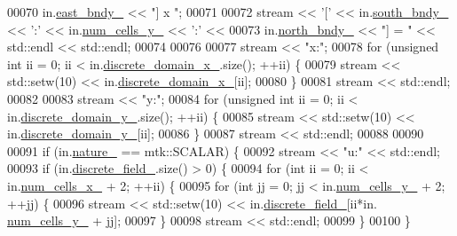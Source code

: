 \begin{DoxyCode}
00070   in.\hyperlink{classmtk_1_1UniStgGrid2D_ae24f3d5bf5ed3a6d066cdf48aa1fb307}{east\_bndy\_} << \textcolor{stringliteral}{"] x "};
00071 
00072   stream << \textcolor{charliteral}{'['} << in.\hyperlink{classmtk_1_1UniStgGrid2D_ac228c81fad7f4feeae93fb3c09d7e175}{south\_bndy\_} << \textcolor{charliteral}{':'} << in.\hyperlink{classmtk_1_1UniStgGrid2D_a3e4f61d781212ad57c34e9446c4074b6}{num\_cells\_y\_} << \textcolor{charliteral}{':'} <<
00073   in.\hyperlink{classmtk_1_1UniStgGrid2D_a3f904091b6e74aa78d8543e5cba26afb}{north\_bndy\_} << \textcolor{stringliteral}{"] = "} << std::endl << std::endl;
00074 
00076 
00077   stream << \textcolor{stringliteral}{"x:"};
00078   \textcolor{keywordflow}{for} (\textcolor{keywordtype}{unsigned} \textcolor{keywordtype}{int} ii = 0; ii < in.\hyperlink{classmtk_1_1UniStgGrid2D_ab15979865852583a46662ea592f27a4f}{discrete\_domain\_x\_}.size(); ++ii) \{
00079     stream << std::setw(10) << in.\hyperlink{classmtk_1_1UniStgGrid2D_ab15979865852583a46662ea592f27a4f}{discrete\_domain\_x\_}[ii];
00080   \}
00081   stream << std::endl;
00082 
00083   stream << \textcolor{stringliteral}{"y:"};
00084   \textcolor{keywordflow}{for} (\textcolor{keywordtype}{unsigned} \textcolor{keywordtype}{int} ii = 0; ii < in.\hyperlink{classmtk_1_1UniStgGrid2D_ad69f93d4b27707d97f209b907383a7a2}{discrete\_domain\_y\_}.size(); ++ii) \{
00085     stream << std::setw(10) << in.\hyperlink{classmtk_1_1UniStgGrid2D_ad69f93d4b27707d97f209b907383a7a2}{discrete\_domain\_y\_}[ii];
00086   \}
00087   stream << std::endl;
00088 
00090 
00091   \textcolor{keywordflow}{if} (in.\hyperlink{classmtk_1_1UniStgGrid2D_ac8b66740d328803f7fbabd1c42c775b2}{nature\_} == mtk::SCALAR) \{
00092     stream << \textcolor{stringliteral}{"u:"} << std::endl;
00093     \textcolor{keywordflow}{if} (in.\hyperlink{classmtk_1_1UniStgGrid2D_ad7474b2669ee988b84aed20b7f5dc7be}{discrete\_field\_}.size() > 0) \{
00094       \textcolor{keywordflow}{for} (\textcolor{keywordtype}{int} ii = 0; ii < in.\hyperlink{classmtk_1_1UniStgGrid2D_ac03a0f4840ee6ae1bc853e5d9c0df8d1}{num\_cells\_x\_} + 2; ++ii) \{
00095         \textcolor{keywordflow}{for} (\textcolor{keywordtype}{int} jj = 0; jj < in.\hyperlink{classmtk_1_1UniStgGrid2D_a3e4f61d781212ad57c34e9446c4074b6}{num\_cells\_y\_} + 2; ++jj) \{
00096           stream << std::setw(10) << in.\hyperlink{classmtk_1_1UniStgGrid2D_ad7474b2669ee988b84aed20b7f5dc7be}{discrete\_field\_}[ii*in.
      \hyperlink{classmtk_1_1UniStgGrid2D_a3e4f61d781212ad57c34e9446c4074b6}{num\_cells\_y\_} + jj];
00097         \}
00098         stream << std::endl;
00099       \}
00100     \}

\end{DoxyCode}
